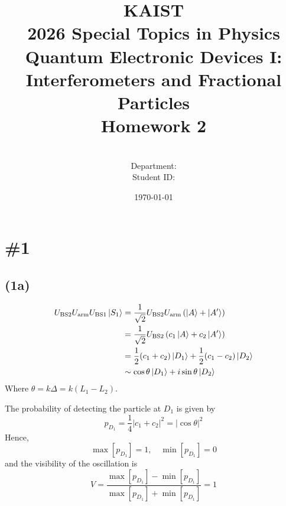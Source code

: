 \documentclass[a4paper,11pt]{article}
\title{KAIST\\2026 Special Topics in Physics Quantum Electronic Devices I: Interferometers and Fractional Particles\\
Homework 2\bigskip}
\author{\textbf{\Large \name} \\
Department: \department\\
Student ID: \studentid}
\date{\today}
\begin{document}
\thispagestyle{empty}
\maketitle
\tableofcontents
{}
\setcounter{secnumdepth}{1}
\setcounter{tocdepth}{2}

\newcommand{\tr}{\operatorname{tr}}
\newcommand{\sgn}{\operatorname{sgn}}
\newcommand{\supp}{\operatorname{supp}}
\renewcommand{\Re}{\operatorname{Re}}
\renewcommand{\Im}{\operatorname{Im}}
\newcommand{\boltz}{k_{\mathrm{B}}}

\section{\#1}
\subsection{(1a)}

\begin{align}
    U_{\text{BS2}}U_{\text{arm}}U_{\text{BS1}}\ket{S_1}
    &= \frac{1}{\sqrt{2}}U_{\text{BS2}}U_{\text{arm}}\left(\ket{A} + \ket{A'}\right) \\
    &= \frac{1}{\sqrt{2}}U_{\text{BS2}}\left(c_1\ket{A} + c_2\ket{A'}\right) \\
    &= \frac{1}{2}(c_1 + c_2)\ket{D_1} + \frac{1}{2}(c_1 - c_2)\ket{D_2}\\
    &\sim \cos \theta \ket{D_1} + i\sin\theta \ket{D_2}
\end{align}
Where $\theta = k\Delta = k(L_1 - L_2)$.

The probability of detecting the particle at $D_1$ is given by
\begin{equation}
    p_{D_1} = \frac{1}{4}|c_1 + c_2|^2 = |\cos \theta|^2
\end{equation}
Hence,
\begin{equation}
    \max[p_{D_1}] = 1, \quad \min[p_{D_1}] = 0
\end{equation}
and the visibility of the oscillation is
\begin{equation}
    V = \frac{\max[p_{D_1}] - \min[p_{D_1}]}{\max[p_{D_1}] + \min[p_{D_1}]} = 1
\end{equation}
\end{document}
